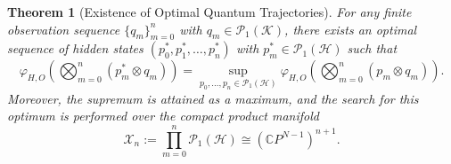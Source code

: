 \documentclass[12pt, reco]{article}
\newtheorem{theorem}{Theorem}[section]
\begin{document}
\begin{theorem}[Existence of Optimal Quantum Trajectories]\label{thm:optimal-sequence-existence}
For any finite observation sequence \(\{q_m\}_{m=0}^n\) with \(q_m \in \mathcal{P}_1(\mathcal{K})\), there exists an optimal sequence of hidden states \((p_0^*, p_1^*, \dots, p_n^*)\) with \(p_m^* \in \mathcal{P}_1(\mathcal{H})\) such that
\[
\varphi_{H,O}\left(\bigotimes_{m=0}^{n} (p_m^* \otimes q_m)\right) = \sup_{p_0,\dots,p_n \in \mathcal{P}_1(\mathcal{H})} \varphi_{H,O}\left(\bigotimes_{m=0}^{n} (p_m \otimes q_m)\right).
\]
Moreover, the supremum is attained as a maximum, and the search for this optimum is performed over the compact product manifold
\[
\mathcal{X}_n := \prod_{m=0}^{n} \mathcal{P}_1(\mathcal{H}) \cong (\mathbb{C}P^{N-1})^{n+1}.
\]
\end{theorem}
\end{document}
